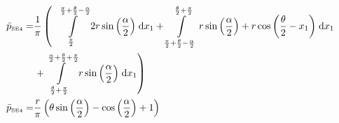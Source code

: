 \begin{align}
    \bar{p}_{\text{\tiny{SE4}}} =&\frac{1}{\pi} \left(\;\;\int\limits_{\frac{\pi}{2}}^{\frac{\pi}{2} + \frac{\theta}{2} - \frac{\alpha}{2}}2 r \sin{\left (\frac{\alpha}{2} \right )}\;\mathrm{d}x_{1}+\int\limits_{\frac{\pi}{2} + \frac{\theta}{2} - \frac{\alpha}{2}}^{\frac{\theta}{2} + \frac{\pi}{2}}r \sin{\left (\frac{\alpha}{2} \right )} + r \cos{\left (\frac{\theta}{2} - x_{1} \right )}\;\mathrm{d}x_{1}\right.\notag\\
 &\left.+\int\limits_{\frac{\theta}{2} + \frac{\pi}{2}}^{\frac{\alpha}{2} + \frac{\theta}{2} + \frac{\pi}{2}}r \sin{\left (\frac{\alpha}{2} \right )}\;\mathrm{d}x_{1}\right)\label{pSE4Def}\\
    \bar{p}_{\text{\tiny{SE4}}}  =& \frac{r}{\pi} \left(\theta \sin{\left (\frac{\alpha}{2} \right )} - \cos{\left (\frac{\alpha}{2} \right )} + 1\right)\label{pSE4Sln}
\end{align}

